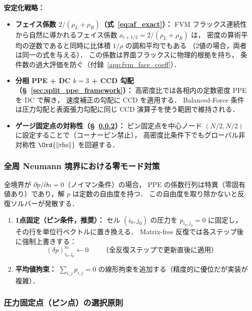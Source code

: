 \noindent\textbf{安定化戦略：}
\begin{itemize}
  \item \textbf{フェイス係数 $2/(\rho_L+\rho_R)$（式~\eqref{eq:af_exact}）：}
        FVM フラックス連続性から自然に導かれるフェイス係数 $a_{i+1/2} = 2/(\rho_L+\rho_R)$ は，
        密度の算術平均の逆数であると同時に比体積 $1/\rho$ の調和平均でもある
        （2値の場合，両者は同一の式を与える）．
        この係数は界面フラックスに物理的根拠を持ち，
        条件数の過大評価を防ぐ（付録~\ref{app:fvm_face_coeff}）．
  \item \textbf{分相 PPE + DC $k{=}3$ + CCD 勾配（§~\ref{sec:split_ppe_framework}）：}
        高密度比では各相内の定数密度 PPE を DC で解き，
        速度補正の勾配に CCD を適用する．
        Balanced-Force 条件は圧力勾配と表面張力勾配に同じ CCD 演算子を使う範囲で維持される．
  \item \textbf{ゲージ固定点の対称性（§~\ref{sec:pinpoint}）：}
        ピン固定点を中心ノード $(N/2, N/2)$ に設定することで（コーナーピン禁止），
        高密度比条件下でもグローバル非対称性 $\Ord{\|\mathrm{rhs}\|}$ を回避する．

\end{itemize}

\subsubsection{全周 Neumann 境界における零モード対策}
\label{sec:ppe_zero_mode}

全境界が $\partial p/\partial n = 0$（ノイマン条件）の場合，
PPE の係数行列は特異（零固有値あり）であり，解 $p$ は定数の自由度を持つ．
この自由度を取り除かないと反復ソルバーが発散する．

\begin{enumerate}
  \item \textbf{1点固定（ピン条件，推奨）：}
        セル $(i_0, j_0)$ の圧力を $p_{i_0,j_0} = 0$ に固定し，その行を単位行ベクトルに置き換える．
        Matrix-free 反復では各ステップ後に強制上書きする：
        \begin{equation}
          (\delta p)^m_{i_0, j_0} \leftarrow 0
          \qquad \text{（全反復ステップで更新直後に適用）}
          \label{eq:pin_overwrite}
        \end{equation}
  \item \textbf{平均値拘束：} $\sum_{i,j} p_{i,j} = 0$ の線形拘束を追加する（精度的に優位だが実装が複雑）．
\end{enumerate}

\subsubsection{圧力固定点（ピン点）の選択原則}
\label{sec:pinpoint}


